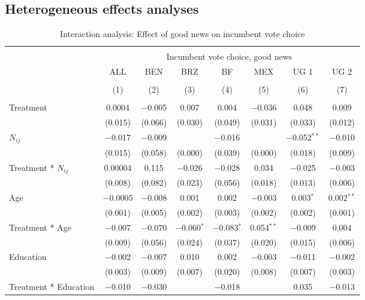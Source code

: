 \documentclass[]{article}
\begin{document}
\subsection{Heterogeneous effects
analyses}\label{heterogeneous-effects-analyses}

\begin{table}[!htbp] \centering 
  \caption{Interaction analysis: Effect of good news on incumbent vote choice} 
  \label{Interaction_good} 
\begin{tabular}{@{\extracolsep{1pt}}lccccccc} 
\\[-1.8ex]\hline 
\hline \\[-1.8ex] 
 & \multicolumn{7}{c}{Incumbent vote choice, good news} \\ 
\cline{2-8} 
 & ALL & BEN & BRZ & BF & MEX & UG 1 & UG 2 \\ 
\\[-1.8ex] & (1) & (2) & (3) & (4) & (5) & (6) & (7)\\ 
\hline \\[-1.8ex] 
 Treatment & 0.0004 & $-$0.005 & 0.007 & 0.004 & $-$0.036 & 0.048 & 0.009 \\ 
  & (0.015) & (0.066) & (0.030) & (0.049) & (0.031) & (0.033) & (0.012) \\ 
  $N_{ij}$ & $-$0.017 & $-$0.009 &  & $-$0.016 &  & $-$0.052$^{**}$ & $-$0.010 \\ 
  & (0.015) & (0.058) & (0.000) & (0.039) & (0.000) & (0.018) & (0.009) \\ 
  Treatment * $N_{ij}$ & 0.00004 & 0.115 & $-$0.026 & $-$0.028 & 0.034 & $-$0.025 & $-$0.003 \\ 
  & (0.008) & (0.082) & (0.023) & (0.056) & (0.018) & (0.013) & (0.006) \\ 
  Age & $-$0.0005 & $-$0.008 & 0.001 & 0.002 & $-$0.003 & 0.003$^{*}$ & 0.002$^{**}$ \\ 
  & (0.001) & (0.005) & (0.002) & (0.003) & (0.002) & (0.002) & (0.001) \\ 
  Treatment * Age & $-$0.007 & $-$0.070 & $-$0.060$^{*}$ & $-$0.083$^{*}$ & 0.054$^{**}$ & $-$0.009 & 0.004 \\ 
  & (0.009) & (0.056) & (0.024) & (0.037) & (0.020) & (0.015) & (0.006) \\ 
  Education & $-$0.002 & $-$0.007 & 0.010 & 0.002 & $-$0.003 & $-$0.011 & $-$0.002 \\ 
  & (0.003) & (0.009) & (0.007) & (0.020) & (0.008) & (0.007) & (0.003) \\ 
  Treatment * Education & $-$0.010 & $-$0.030 &  & $-$0.018 &  & 0.035 & $-$0.013 \\ 

\end{tabular}
\end{table}
\end{document}
